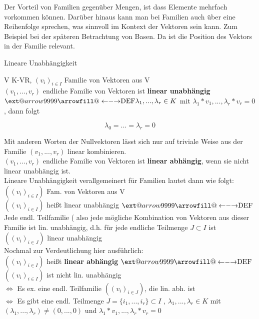 \documentclass[smallheadings,12pt,a4paper]{scrartcl}
\makeatletter
\newcommand\xleftrightarrow[2][]{%
  \ext@arrow 9999{\longleftrightarrowfill@}{#1}{#2}}
\newcommand\longleftrightarrowfill@{%
  \arrowfill@\leftarrow\relbar\rightarrow}
\makeatother
\begin{document}
Der Vorteil von Familien gegenüber Mengen, ist dass Elemente mehrfach vorkommen können. Darüber hinaus kann man bei Familien auch über eine Reihenfolge sprechen, was sinnvoll im Kontext der Vektoren sein kann. Zum Beispiel bei der späteren Betrachtung von Basen. Da ist die Position des Vektors in der Familie relevant. \\

\newpage

\begin{center}
\item[Lineare Unabhängigkeit]
\end{center}

V K-VR, $(v_i)_{i \in I}$ Familie von Vektoren aus V \\
$(v_1,...,v_r)$ endliche Familie von Vektoren ist \textbf{linear unabhängig} $ \xleftrightarrow{\text{DEF}} \lambda_1,..., \lambda_r \in K $ mit $ \lambda_1 * v_1 ,..., \lambda_r * v_r = 0 $, dann folgt 

$$ \lambda_0 = ... = \lambda_r = 0 $$

Mit anderen Worten der Nullvektoren lässt sich nur auf triviale Weise aus der Familie $(v_1,...,v_r)$ linear kombinieren. \\
$(v_1,...,v_r)$ endliche Familie von Vektoren ist \textbf{linear abhängig}, wenn sie nicht linear unabhängig ist. \\

Lineare Unabhängigkeit verallgemeinert für Familien lautet dann wie folgt: \\
$((v_i)_{i \in I}) $ Fam. von Vektoren aus V \\
$((v_i)_{i \in I})$ heißt linear unabhängig $ \xleftrightarrow{\text{DEF}} $ Jede endl. Teilfamilie ( also jede mögliche Kombination von Vektoren aus dieser Familie ist lin. unabhängig, d.h. für jede endliche Teilmenge $J \subset I $ ist $((v_i)_{i \in J})$ linear unabhängig \\

Nochmal zur Verdeutlichung hier ausführlich: \\
$((v_i)_{i \in I})$ heißt \textbf{linear abhängig} $ \xleftrightarrow{\text{DEF}} $ $((v_i)_{i \in I})$ ist nicht lin. unabhängig \\

$ \Leftrightarrow $ Es ex. eine endl. Teilfamilie $((v_i)_{i \in J})$, die lin. abh. ist  \\

$ \Leftrightarrow $ Es gibt eine endl. Teilmenge $J=\{i_1,...,i_r\} \subset I $ , $ \lambda_1,..., \lambda_r \in K $ mit \\
$ ( \lambda_1,..., \lambda_r ) \neq (0,...,0) $ und $ \lambda_1 * v_1 ,..., \lambda_r * v_r = 0 $ \\
\end{document}
